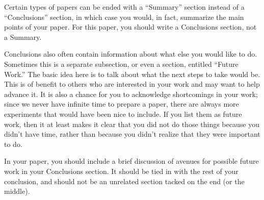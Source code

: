\documentclass[12pt,letterpaper]{article}
\begin{document}
Certain types of papers can be ended with a ``Summary'' section instead of a
``Conclusions'' section, in which case you would, in fact, summarize the main
points of your paper.  For this paper, you should write a Conclusions section,
not a Summary.

Conclusions also often contain information about what else you would like
to do.  Sometimes this is a separate subsection, or even a section, entitled
``Future Work.''  The basic idea here is to talk about what the next steps to
take would be.  This is of benefit to others who are interested in your
work and may want to help advance it.  It is also a chance for you to
acknowledge shortcomings in your work; since we never have infinite time to
prepare a paper, there are always more experiments that would have been nice to
include.  If you list them as future work, then it at least makes it clear that
you did not do those things because you didn't have time, rather than because you
didn't realize that they were important to do.

In your paper, you should include a brief discussion of avenues for possible
future work in your Conclusions section.  It should be tied in with the rest of
your conclusion, and should not be an unrelated section tacked on the end (or
the middle).

\newpage



\nocite{*}
\end{document}
